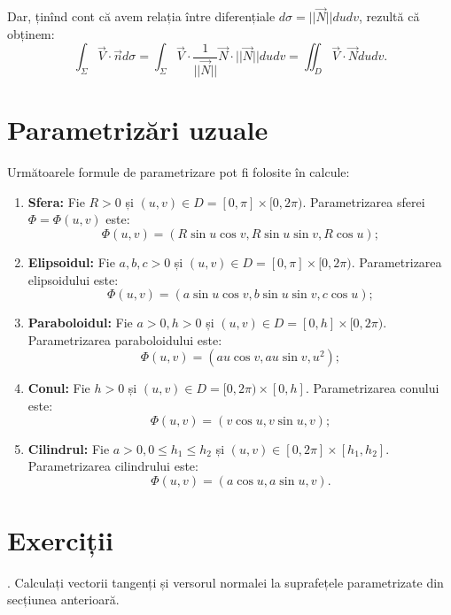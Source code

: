 Dar, ținînd cont că avem relația între diferențiale $ d\sigma = ||\vec{N}|| dudv $,
rezultă că obținem:
\[
  \int_\Sigma \vec{V} \cdot \vec{n} d\sigma = \int_\Sigma \vec{V} \cdot \dfrac{1}{||\vec{N}||} \vec{N} \cdot ||\vec{N}|| dudv = %
  \iint_D \vec{V} \cdot \vec{N} dudv.
\]



\section{Parametrizări uzuale}

Următoarele formule de parametrizare pot fi folosite în calcule:
\begin{enumerate}[(1)]
\item \textbf{Sfera:} Fie $ R > 0 $ și $ (u, v) \in D = [0, \pi] \times [0, 2\pi) $.
  Parametrizarea sferei $ \Phi = \Phi(u, v) $ este:
  \[
    \Phi(u, v) = (R \sin u \cos v, R \sin u \sin v, R \cos u);
  \]
\item \textbf{Elipsoidul:} Fie $ a, b, c > 0 $ și
  $ (u, v) \in D = [0, \pi] \times [0, 2\pi) $. Parametrizarea elipsoidului este:
  \[
    \Phi(u, v) = (a \sin u \cos v, b \sin u \sin v, c \cos u);
  \]
\item \textbf{Paraboloidul:} Fie $ a > 0, h > 0 $ și
  $ (u, v) \in D = [0, h] \times [0, 2\pi) $. Parametrizarea paraboloidului este:
  \[
    \Phi(u, v) = (au\cos v, au \sin v, u^2);
  \]
\item \textbf{Conul:} Fie $ h > 0 $ și $ (u, v) \in D = [0, 2\pi) \times [0, h] $.
  Parametrizarea conului este:
  \[
    \Phi(u, v) = (v \cos u, v \sin u, v);
  \]
\item \textbf{Cilindrul:} Fie $ a > 0, 0 \leq h_1 \leq h_2 $ și
  $ (u, v) \in [0, 2\pi] \times [h_1, h_2] $. Parametrizarea cilindrului
  este:
  \[
    \Phi(u, v) = (a \cos u, a \sin u, v).
  \]
\end{enumerate}



\section{Exerciții}

\indent{}. Calculați vectorii tangenți și versorul normalei la suprafețele
parametrizate din secțiunea anterioară.

\vspace{0.5cm}

